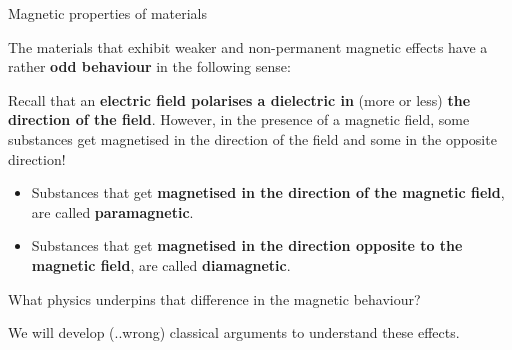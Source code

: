 %
%
%

\begin{frame}{Magnetic properties of materials}

The materials that exhibit weaker and non-permanent magnetic effects
have a rather {\bf odd behaviour} in the following sense:\\

\vspace{0.3cm}

Recall that an {\bf electric field polarises a dielectric in}
(more or less) {\bf the direction of the field}.
However, in the presence of a magnetic field, some substances get
magnetised in the direction of the field and some in the opposite direction!

\vspace{0.2cm}

\begin{itemize}
  \item Substances that get {\bf magnetised in the direction of the magnetic field},
        are called {\bf \color{blue} paramagnetic}.
  \item Substances that get {\bf magnetised in the direction opposite to the magnetic field},
        are called {\bf \color{magenta} diamagnetic}.
\end{itemize}

\vspace{0.3cm}

What physics underpins that difference in the magnetic behaviour?\\

\vspace{0.2cm}

We will develop (..wrong) classical arguments to understand these effects.

\end{frame}



